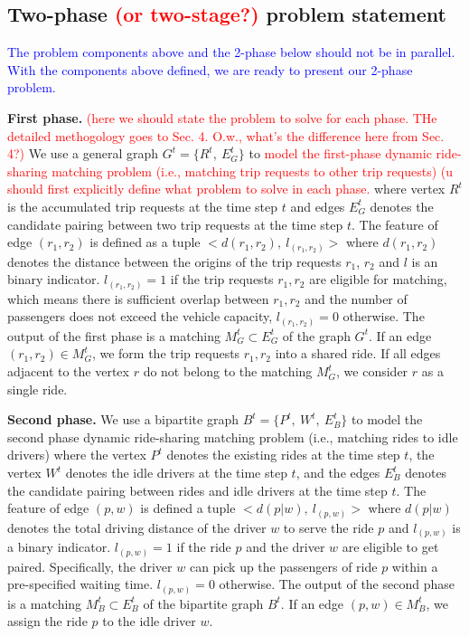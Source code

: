 \documentclass[sigconf]{acmart}
\newcommand{\tcr}[1]{{\textcolor{red}{#1}}}
\newcommand{\tcb}[1]{{\textcolor{blue}{#1}}}
\begin{document}
\subsection{Two-phase \tcr{(or two-stage?)} problem statement}

\tcb{The problem components above and the 2-phase below should not be in parallel. With the components above defined, we are ready to present our 2-phase problem.}

\textbf{First phase.} \tcr{(here we should state the problem to solve for each phase. THe detailed methogology goes to Sec. 4. O.w., what's the difference here from Sec. 4?)} We use a general graph $G^{t}=\{R^{t},\ E_{G}^{t}\}$
to \tcr{model the first-phase dynamic ride-sharing matching problem (i.e.,
matching trip requests to other trip requests) (u should first explicitly define what problem to solve in each phase.} where vertex $R^{t}$
is the accumulated trip requests at the time step $t$ and edges $E_{G}^{t}$
denotes the candidate pairing between two trip requests at the time
step $t$. The feature of edge $(r_{1},r_{2})$ is defined as a tuple
$<d(r_{1},r_{2}),\ l_{(r_{1},r_{2})}>$ where $d(r_{1},r_{2})$ denotes
the distance between the origins of the trip requests $r_{1}$, $r_{2}$
and $l$ is an binary indicator. $l_{(r_{1},r_{2})}=1$ if the trip
requests $r_{1},r_{2}$ are eligible for matching, which means there
is sufficient overlap between $r_{1},r_{2}$ and the number of passengers
does not exceed the vehicle capacity, $l_{(r_{1},r_{2})}=0$ otherwise.
The output of the first phase is a matching $M_{G}^{t}\subset E_{G}^{t}$
of the graph $G^{t}$. If an edge $(r_{1},r_{2})\in M_{G}^{t}$, we
form the trip requests $r_{1},r_{2}$ into a shared ride. If all edges
adjacent to the vertex $r$ do not belong to the matching $M_{G}^{t}$,
we consider $r$ as a single ride. 

\textbf{Second phase.} We use a bipartite graph $B^{t}=\{P^{t},\ W^{t},\ E_{B}^{t}\}$
to model the second phase dynamic ride-sharing matching problem (i.e.,
matching rides to idle drivers) where the vertex $P^{t}$ denotes
the existing rides at the time step $t$, the vertex $W^{t}$ denotes
the idle drivers at the time step $t$, and the edges $E_{B}^{t}$
denotes the candidate pairing between rides and idle drivers at the
time step $t$. The feature of edge $(p,w)$ is defined a tuple $<d(p|w),\ l_{(p,w)}>$
where $d(p|w)$ denotes the total driving distance of the driver $w$
to serve the ride $p$ and $l_{(p,w)}$ is a binary indicator. $l_{(p,w)}=1$
if the ride $p$ and the driver $w$ are eligible to get paired. Specifically,
the driver $w$ can pick up the passengers of ride $p$ within a pre-specified
waiting time. $l_{(p,w)}=0$ otherwise. The output of the second phase
is a matching $M_{B}^{t}\subset E_{B}^{t}$ of the bipartite graph
$B^{t}$. If an edge $(p,w)\in M_{B}^{t}$, we assign the ride $p$
to the idle driver $w$.
\end{document}
